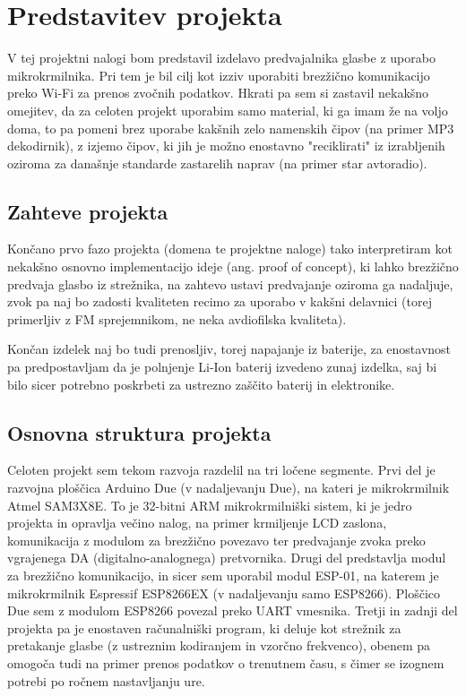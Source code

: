 \documentclass[12pt,a4paper,twoside,openright,slovene]{book}
\date{Ljubljana, Junij 2021}
\begin{document}
\frontmatter


\maketitle

\tableofcontents

\mainmatter

\chapter{Predstavitev projekta} \label{predstavitev}
V tej projektni nalogi bom predstavil izdelavo predvajalnika glasbe z uporabo mikrokrmilnika. Pri tem je bil cilj kot izziv uporabiti brezžično komunikacijo preko Wi-Fi za prenos zvočnih podatkov. Hkrati pa sem si zastavil nekakšno omejitev, da za celoten projekt uporabim samo material, ki ga imam že na voljo doma, to pa pomeni brez uporabe kakšnih zelo namenskih čipov (na primer MP3 dekodirnik), z izjemo čipov, ki jih je možno enostavno "reciklirati" iz izrabljenih oziroma za današnje standarde zastarelih naprav (na primer star avtoradio).

\section{Zahteve projekta}
Končano prvo fazo projekta (domena te projektne naloge) tako interpretiram kot nekakšno osnovno implementacijo ideje (ang. proof of concept), ki lahko brezžično predvaja glasbo iz strežnika, na zahtevo ustavi predvajanje oziroma ga nadaljuje, zvok pa naj bo zadosti kvaliteten recimo za uporabo v kakšni delavnici (torej primerljiv z FM sprejemnikom, ne neka avdiofilska kvaliteta).

Končan izdelek naj bo tudi prenosljiv, torej napajanje iz baterije, za enostavnost pa predpostavljam da je polnjenje Li-Ion baterij izvedeno zunaj izdelka, saj bi bilo sicer potrebno poskrbeti za ustrezno zaščito baterij in elektronike.

\section{Osnovna struktura projekta}
Celoten projekt sem tekom razvoja razdelil na tri ločene segmente. Prvi del je razvojna ploščica Arduino Due (v nadaljevanju Due), na kateri je mikrokrmilnik Atmel SAM3X8E. To je 32-bitni ARM mikrokrmilniški sistem, ki je jedro projekta in opravlja večino nalog, na primer krmiljenje LCD zaslona, komunikacija z modulom za brezžično povezavo ter predvajanje zvoka preko vgrajenega DA (digitalno-analognega) pretvornika. Drugi del predstavlja modul za brezžično komunikacijo, in sicer sem uporabil modul ESP-01, na katerem je mikrokrmilnik Espressif ESP8266EX (v nadaljevanju samo ESP8266). Ploščico Due sem z modulom ESP8266 povezal preko UART vmesnika. Tretji in zadnji del projekta pa je enostaven računalniški program, ki deluje kot strežnik za pretakanje glasbe (z ustreznim kodiranjem in vzorčno frekvenco), obenem pa omogoča tudi na primer prenos podatkov o trenutnem času, s čimer se izognem potrebi po ročnem nastavljanju ure.
\end{document}
